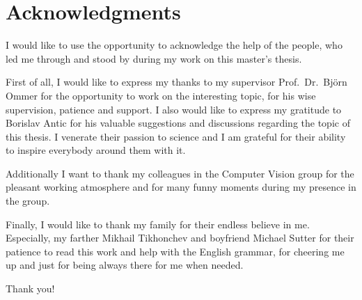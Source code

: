 
\chapter*{Acknowledgments}
\thispagestyle{empty}

I would like to use the opportunity to acknowledge the help of the people, who led me through and stood by during my work on this master's thesis.

First of all, I would like to express my thanks to my supervisor Prof.~Dr.~Bj\"{o}rn Ommer for the opportunity to work on the interesting topic, for his wise supervision, patience and support. I also would like to express my gratitude to Borislav Antic for his valuable suggestions and discussions regarding the topic of this thesis. I venerate their passion to science and I am grateful for their ability to inspire everybody around them with it.

Additionally I want to thank my colleagues in the Computer Vision group for the pleasant working atmosphere and for many funny moments during my presence in the group.

Finally, I would like to thank my family for their endless believe in me. Especially, my farther Mikhail Tikhonchev and boyfriend Michael Sutter for their patience to read this work and help with the English grammar, for cheering me up and just for being always there for me when needed.

Thank you!

